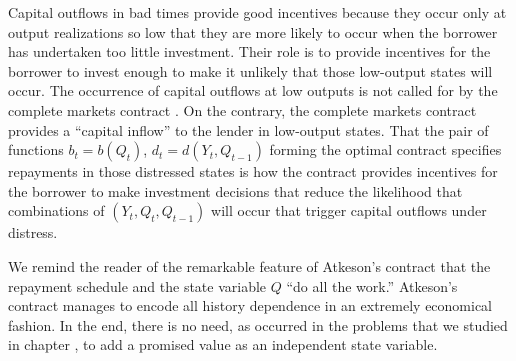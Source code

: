 Capital outflows in bad times
provide good incentives because they occur only at output
realizations so low that they are more likely  to occur when
the borrower has undertaken too little investment.   Their role is to
provide incentives for the borrower to invest enough
to make it unlikely that those low-output states will occur.
The occurrence of
 capital outflows at low outputs is not
called for by
the complete markets contract . On the contrary,
the complete markets
contract provides
a ``capital inflow'' to the lender in low-output states.
That the pair of functions
 $b_t = b(Q_t)$, $d_t = d(Y_t, Q_{t-1})$ forming the optimal
contract  specifies repayments in those distressed  states is how the
contract provides incentives for the borrower to make
investment decisions that reduce the likelihood that combinations of
$(Y_t, Q_t, Q_{t-1})$ will occur that
trigger capital outflows under distress.

%
We remind the reader of the remarkable feature of Atkeson's
contract that the repayment schedule and the state
variable $Q$ ``do all the work.''  Atkeson's contract
manages to encode all history dependence in an extremely
economical fashion.  In the end, there is no need, as occurred
in the problems that we studied in chapter ,
to add a promised value as an independent state 
variable.

%



  
  
